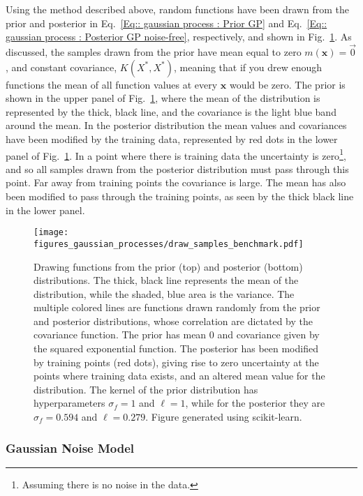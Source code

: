 \documentclass[twoside,english]{uiofysmaster}
\begin{document}
Using the method described above, random functions have been drawn from the prior and posterior in Eq.~\ref{Eq:: gaussian process : Prior GP} and Eq.~\ref{Eq:: gaussian process : Posterior GP noise-free}, respectively, and shown in Fig.~\ref{Fig:: gaussian process : prior posterior drawn samples}. As discussed, the samples drawn from the prior have mean equal to zero $m(\textbf{x})=\vec{0}$, and constant covariance, $K(X^*, X^*)$, meaning that if you drew enough functions the mean of all function values at every $\textbf{x}$ would be zero. The prior is shown in the upper panel of Fig.~\ref{Fig:: gaussian process : prior posterior drawn samples}, where the mean of the distribution is represented by the thick, black line, and the covariance is the light blue band around the mean. In the posterior distribution the mean values and covariances have been modified by the training data, represented by red dots in the lower panel of Fig.~\ref{Fig:: gaussian process : prior posterior drawn samples}. In a point where there is training data the uncertainty is zero\footnote{Assuming there is no noise in the data.}, and so all samples drawn from the posterior distribution must pass through this point. Far away from training points the covariance is large. The mean has also been modified to pass through the training points, as seen by the thick black line in the lower panel.

\begin{figure}
\centering
\texttt{[image: figures\_gaussian\_processes/draw\_samples\_benchmark.pdf]}
\caption{Drawing functions from the prior (top) and posterior (bottom) distributions. The thick, black line represents the mean of the distribution, while the shaded, blue area is the variance. The multiple colored lines are functions drawn randomly from the prior and posterior distributions, whose correlation are dictated by the covariance function. The prior has mean 0 and covariance given by the squared exponential function. The posterior has been modified by training points (red dots), giving rise to zero uncertainty at the points where training data exists, and an altered mean value for the distribution. The kernel of the prior distribution has hyperparameters $\sigma_f = 1$ and $\ell = 1$, while for the posterior they are $\sigma_f = 0.594$ and $\ell = 0.279$. Figure generated using scikit-learn.}
\label{Fig:: gaussian process : prior posterior drawn samples}
\end{figure}

\subsubsection{Gaussian Noise Model}\label{Sec: gaussian process : Gaussian Noise Model}
\end{document}
